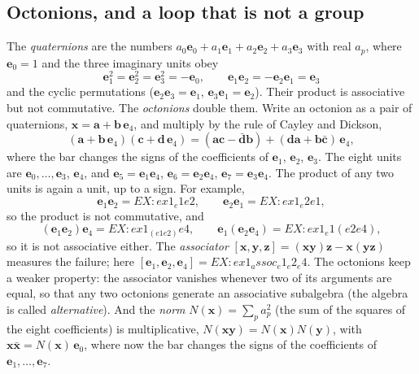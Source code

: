 \documentclass[aps,prd,twocolumn,superscriptaddress,nofootinbib,floatfix,longbibliography]{revtex4-2}
\newcommand{\e}[1]{\mathbf e_{#1}}
\begin{document}
\subsection{Octonions, and a loop that is not a group}
\label{sec:oct}

The \emph{quaternions} are the numbers $a_0\e0+a_1\e1+a_2\e2+a_3\e3$ with real $a_p$, where $\e0=1$ and the three
imaginary units obey
\begin{equation}
\e1^2=\e2^2=\e3^2=-\e0,\qquad \e1\e2=-\e2\e1=\e3
\label{eq:quat}
\end{equation}
and the cyclic permutations ($\e2\e3=\e1$, $\e3\e1=\e2$). Their product is associative but not commutative. The
\emph{octonions} double them. Write an octonion as a pair of quaternions, $\mathbf x=\mathbf a+\mathbf b\,\e4$, and
multiply by the rule of Cayley and Dickson,
\begin{equation}
(\mathbf a+\mathbf b\,\e4)(\mathbf c+\mathbf d\,\e4)=(\mathbf a\mathbf c-\bar{\mathbf d}\mathbf b)+(\mathbf d\mathbf a
+\mathbf b\bar{\mathbf c})\,\e4 ,
\label{eq:cd}
\end{equation}
where the bar changes the signs of the coefficients of $\e1$, $\e2$, $\e3$. The eight units are $\e0,\dots,\e3$, $\e4$,
and $\e5=\e1\e4$, $\e6=\e2\e4$, $\e7=\e3\e4$. The product of any two units is again a unit, up to a sign. For example,
\begin{equation}
\e1\e2={{EX:ex1_e1e2}},\qquad \e2\e1={{EX:ex1_e2e1}},
\end{equation}
so the product is not commutative, and
\begin{equation}
(\e1\e2)\e4={{EX:ex1_(e1e2)e4}},\qquad \e1(\e2\e4)={{EX:ex1_e1(e2e4)}},
\label{eq:nonassoc}
\end{equation}
so it is not associative either. The \emph{associator} $[\mathbf x,\mathbf y,\mathbf z]=(\mathbf x\mathbf y)\mathbf
z-\mathbf x(\mathbf y\mathbf z)$ measures the failure; here $[\e1,\e2,\e4]={{EX:ex1_assoc_e1_e2_e4}}$. The octonions keep
a weaker property: the associator vanishes whenever two of its arguments are equal, so that any two octonions generate
an associative subalgebra (the algebra is called \emph{alternative}). And the \emph{norm}
$N(\mathbf x)=\sum_pa_p^2$ (the sum of the squares of the eight coefficients) is multiplicative,
$N(\mathbf x\mathbf y)=N(\mathbf x)N(\mathbf y)$, with $\mathbf x\bar{\mathbf x}=N(\mathbf x)\,\e0$, where now the bar
changes the signs of the coefficients of $\e1,\dots,\e7$.
\end{document}
